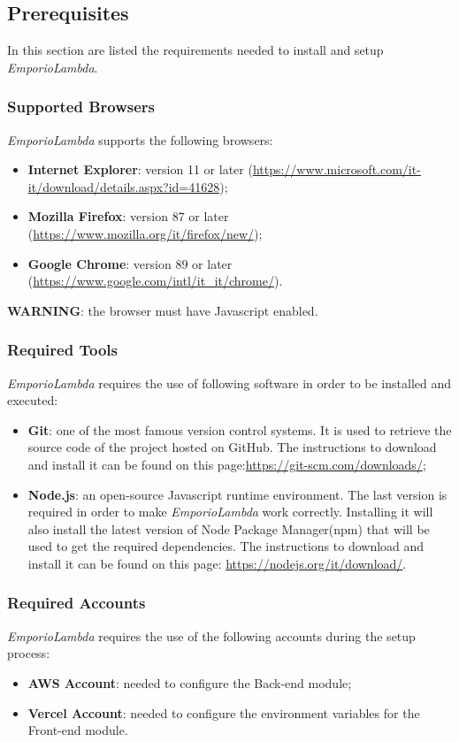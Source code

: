 \subsection{Prerequisites}
In this section are listed the requirements needed to install and setup \textit{EmporioLambda}.

\subsubsection{Supported Browsers}
\textit{EmporioLambda} supports the following browsers:
\begin{itemize}
\item \textbf{Internet Explorer}: version 11 or later (\url{https://www.microsoft.com/it-it/download/details.aspx?id=41628});
\item \textbf{Mozilla Firefox}: version 87 or later (\url{https://www.mozilla.org/it/firefox/new/});
\item \textbf{Google Chrome}: version 89 or later (\url{https://www.google.com/intl/it_it/chrome/}).
\end{itemize}
\textbf{WARNING}: the browser must have Javascript enabled.

\subsubsection{Required Tools}
\textit{EmporioLambda} requires the use of following software in order to be installed and executed:
\begin{itemize}
\item \textbf{Git}: one of the most famous version control systems. It is used to retrieve the source code of the project hosted on GitHub. The instructions to download and install it can be found on this page:\url{https://git-scm.com/downloads/};
\item \textbf{Node.js}: an open-source Javascript runtime environment. The last version is required in order to make \textit{EmporioLambda} work correctly. Installing it will also install the latest version of Node Package Manager(npm) that will be used to get the required dependencies. The instructions to download and install it can be found on this page: \url{https://nodejs.org/it/download/}.
\end{itemize}

\subsubsection{Required Accounts}
\textit{EmporioLambda} requires the use of the following accounts during the setup process:
\begin{itemize}
\item \textbf{AWS Account}: needed to configure the Back-end module;
\item \textbf{Vercel Account}: needed to configure the environment variables for the Front-end module.
\end{itemize}

